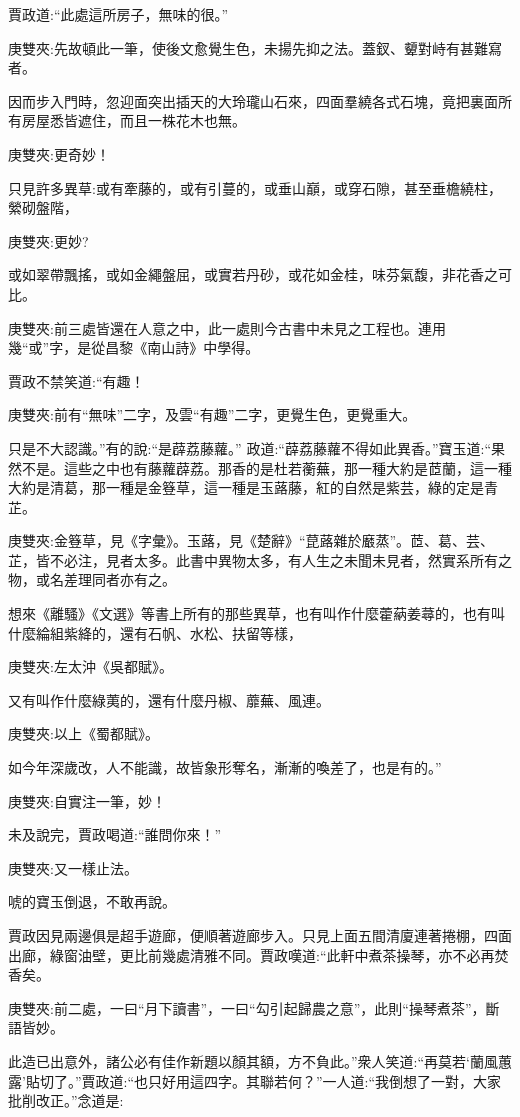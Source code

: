 \begin{parag}
    賈政道:“此處這所房子，無味的很。”\begin{note}庚雙夾:先故頓此一筆，使後文愈覺生色，未揚先抑之法。蓋釵、顰對峙有甚難寫者。\end{note}因而步入門時，忽迎面突出插天的大玲瓏山石來，四面羣繞各式石塊，竟把裏面所有房屋悉皆遮住，而且一株花木也無。\begin{note}庚雙夾:更奇妙！\end{note}只見許多異草:或有牽藤的，或有引蔓的，或垂山巔，或穿石隙，甚至垂檐繞柱，縈砌盤階，\begin{note}庚雙夾:更妙?\end{note}或如翠帶飄搖，或如金繩盤屈，或實若丹砂，或花如金桂，味芬氣馥，非花香之可比。\begin{note}庚雙夾:前三處皆還在人意之中，此一處則今古書中未見之工程也。連用幾“或”字，是從昌黎《南山詩》中學得。\end{note}賈政不禁笑道:“有趣！\begin{note}庚雙夾:前有“無味”二字，及雲“有趣”二字，更覺生色，更覺重大。\end{note}只是不大認識。”有的說:“是薜荔藤蘿。” 政道:“薜荔藤蘿不得如此異香。”寶玉道:“果然不是。這些之中也有藤蘿薜荔。那香的是杜若蘅蕪，那一種大約是茝蘭，這一種大約是清葛，那一種是金簦草，這一種是玉蕗藤，紅的自然是紫芸，綠的定是青芷。\begin{note}庚雙夾:金簦草，見《字彙》。玉蕗，見《楚辭》“菎蕗雜於黀蒸”。茝、葛、芸、芷，皆不必注，見者太多。此書中異物太多，有人生之未聞未見者，然實系所有之物，或名差理同者亦有之。\end{note}想來《離騷》《文選》等書上所有的那些異草，也有叫作什麼藿蒳姜蕁的，也有叫什麼綸組紫絳的，還有石帆、水松、扶留等樣，\begin{note}庚雙夾:左太沖《吳都賦》。\end{note}又有叫作什麼綠荑的，還有什麼丹椒、蘼蕪、風連。\begin{note}庚雙夾:以上《蜀都賦》。\end{note}如今年深歲改，人不能識，故皆象形奪名，漸漸的喚差了，也是有的。”\begin{note}庚雙夾:自實注一筆，妙！\end{note}未及說完，賈政喝道:“誰問你來！”\begin{note}庚雙夾:又一樣止法。\end{note}唬的寶玉倒退，不敢再說。
\end{parag}


\begin{parag}
    賈政因見兩邊俱是超手遊廊，便順著遊廊步入。只見上面五間清廈連著捲棚，四面出廊，綠窗油壁，更比前幾處清雅不同。賈政嘆道:“此軒中煮茶操琴，亦不必再焚香矣。\begin{note}庚雙夾:前二處，一曰“月下讀書”，一曰“勾引起歸農之意”，此則“操琴煮茶”，斷語皆妙。\end{note}此造已出意外，諸公必有佳作新題以顏其額，方不負此。”衆人笑道:“再莫若‘蘭風蕙露’貼切了。”賈政道:“也只好用這四字。其聯若何？”一人道:“我倒想了一對，大家批削改正。”念道是:
\end{parag}


